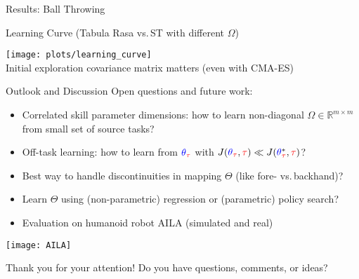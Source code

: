 \documentclass[11pt]{beamer}
\newcommand{\taskparam}{{\color{red} \tau}}
\newcommand{\skillparam}{{\color{blue} \theta}}
\begin{document}
\begin{frame}{Results: Ball Throwing}
   \begin{center}
   Learning Curve (Tabula Rasa vs.\,ST with different $\Omega$)
   \end{center}
   \begin{center}
         \texttt{[image: plots/learning\_curve]}\\
         Initial exploration covariance matrix matters (even with CMA-ES)
   \end{center}
\end{frame}

\begin{frame}{Outlook and Discussion}
  Open questions and future work:
  \begin{itemize}
    \item Correlated skill parameter dimensions: how to learn non-diagonal $\Omega \in \mathbb{R}^{m \times m}$ from small set of source tasks?
    \item Off-task learning: how to learn from $\skillparam_{\taskparam}$ with $J(\skillparam_{\taskparam},\taskparam) \ll J(\skillparam_{\taskparam}^*,\taskparam)$?
    \item Best way to handle discontinuities in mapping $\Theta$ (like fore- vs.\,backhand)?
    \item Learn $\Theta$ using (non-parametric) regression or (parametric) policy search?
    \pause
    \item Evaluation on humanoid robot AILA (simulated and real)
  \end{itemize}

  \begin{center}
    \texttt{[image: AILA]}
  \end{center}
  \pause
  \begin{center}
   Thank you for your attention!
   Do you have questions, comments, or ideas?
   \end{center}

\end{frame}
\end{document}
